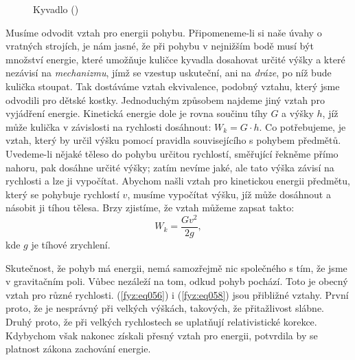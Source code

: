     \begin{figure}[ht!] %
      \centering
      \caption{Kyvadlo (\cite[s.~56]{Feynman01})}
      \label{fyz:fig0054}
    \end{figure}
    Musíme odvodit vztah pro energii pohybu. Připomeneme-li si naše úvahy o vratných strojích, je 
    nám jasné, že při pohybu v nejnižším bodě musí být množství energie, které umožňuje kuličce 
    kyvadla dosahovat určité výšky a které nezávisí na \emph{mechanizmu}, jímž se vzestup 
    uskuteční, ani na \emph{dráze}, po níž bude kulička stoupat. Tak dostáváme vztah ekvivalence, 
    podobný vztahu, který jsme odvodili pro dětské kostky. Jednoduchým způsobem najdeme jiný vztah 
    pro vyjádření energie. Kinetická energie dole je rovna součinu tíhy \(G\) a výšky \(h\), jíž 
    může kulička v závislosti na rychlosti dosáhnout: \(W_k=G\cdot h\). Co potřebujeme, je vztah, 
    který by určil výšku pomocí pravidla souvisejícího s pohybem předmětů. Uvedeme-li nějaké těleso 
    do pohybu určitou rychlostí, směřující řekněme přímo nahoru, pak dosáhne určité výšky; zatím 
    nevíme jaké, ale tato výška závisí na rychlosti a lze ji vypočítat. Abychom našli vztah pro 
    kinetickou energii předmětu, který se pohybuje rychlostí \(v\), musíme vypočítat výšku, jíž 
    může dosáhnout a násobit ji tíhou tělesa. Brzy zjistíme, že vztah můžeme zapsat takto:
    \begin{equation}\label{fyz:eq058}
      W_k = \frac{Gv^2}{2g},
    \end{equation}
    kde \(g\) je tíhové zrychlení.
    
    Skutečnost, že pohyb má energii, nemá samozřejmě nic společného s tím, že jsme v gravitačním 
    poli. Vůbec nezáleží na tom, odkud pohyb pochází. Toto je obecný vztah pro různé rychlosti. 
    (\ref{fyz:eq056}) i (\ref{fyz:eq058}) jsou přibližné vztahy. První proto, že je nesprávný při 
    velkých výškách, takových, že přitažlivost slábne. Druhý proto, že při velkých rychlostech se 
    uplatňují relativistické korekce. Kdybychom však nakonec získali přesný vztah pro energii, 
    potvrdila by se platnost zákona zachování energie.

